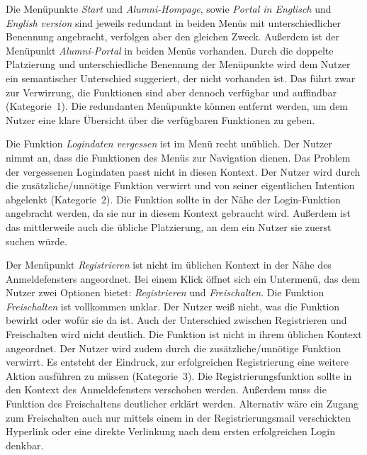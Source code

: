 {Die Menüpunkte \emph{Start} und \emph{Alumni-Hompage}, sowie \emph{Portal in Englisch} und \emph{English version} sind jeweils redundant in beiden Menüs mit unterschiedlicher Benennung angebracht, verfolgen aber den gleichen Zweck. Außerdem ist der Menüpunkt \emph{Alumni-Portal} in beiden Menüs vorhanden.
}
{Durch die doppelte Platzierung und unterschiedliche Benennung der Menüpunkte wird dem Nutzer ein semantischer Unterschied suggeriert, der nicht vorhanden ist. Das führt zwar zur Verwirrung, die Funktionen sind aber dennoch verfügbar und auffindbar (Kategorie~1).
}
{Die redundanten Menüpunkte können entfernt werden, um dem Nutzer eine klare Übersicht über die verfügbaren Funktionen zu geben. 
}\label{prob:start:funktionen}

{Die Funktion \emph{Logindaten vergessen} ist im Menü recht unüblich. Der Nutzer nimmt an, dass die Funktionen des Menüs zur Navigation dienen. Das Problem der vergessenen Logindaten passt nicht in diesen Kontext.
}
{Der Nutzer wird durch die zusätzliche/unnötige Funktion verwirrt und von seiner eigentlichen Intention abgelenkt (Kategorie~2).
}
{Die Funktion sollte in der Nähe der Login-Funktion angebracht werden, da sie nur in diesem Kontext gebraucht wird. Außerdem ist das mittlerweile auch die übliche Platzierung, an dem ein Nutzer sie zuerst suchen würde.
}\label{prob:start:pkt:login}

{Der Menüpunkt \emph{Registrieren} ist nicht im üblichen Kontext in der Nähe des Anmeldefensters angeordnet. Bei einem Klick öffnet sich ein Untermenü, das dem Nutzer zwei Optionen bietet: \emph{Registrieren} und \emph{Freischalten}.
Die Funktion \emph{Freischalten} ist vollkommen unklar. Der Nutzer weiß nicht, was die Funktion bewirkt oder wofür sie da ist. Auch der Unterschied zwischen Registrieren und Freischalten wird nicht deutlich.
}{Die Funktion ist nicht in ihrem üblichen Kontext angeordnet. Der Nutzer wird zudem durch die zusätzliche/unnötige Funktion verwirrt. Es entsteht der Eindruck, zur erfolgreichen Registrierung eine weitere Aktion ausführen zu müssen (Kategorie~3).}
{Die Registrierungsfunktion sollte in den Kontext des Anmeldefensters verschoben werden. Außerdem muss die Funktion des Freischaltens deutlicher erklärt werden. Alternativ wäre ein Zugang zum Freischalten auch nur mittels einem in der Registrierungsmail verschickten Hyperlink oder eine direkte Verlinkung nach dem ersten erfolgreichen Login denkbar.
}\label{prob:start:pkt:reg}

